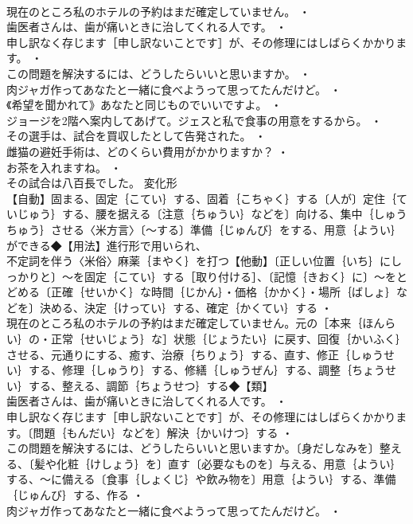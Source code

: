 \documentclass[8pt]{extreport}
\begin{document}
\begin{CJK}{UTF8}{min}
\\	現在のところ私のホテルの予約はまだ確定していません。 ・
\\	歯医者さんは、歯が痛いときに治してくれる人です。 ・
\\	申し訳なく存じます［申し訳ないことです］が、その修理にはしばらくかかります。 ・
\\	この問題を解決するには、どうしたらいいと思いますか。 ・
\\	肉ジャガ作ってあなたと一緒に食べようって思ってたんだけど。 ・
\\	《希望を聞かれて》あなたと同じものでいいですよ。 ・
\\	ジョージを2階へ案内してあげて。ジェスと私で食事の用意をするから。 ・
\\	その選手は、試合を買収したとして告発された。 ・
\\	雌猫の避妊手術は、どのくらい費用がかかりますか？ ・
\\	お茶を入れますね。 ・
\\	その試合は八百長でした。	変化形 
\\	【自動】固まる、固定｛こてい｝する、固着｛こちゃく｝する〔人が〕定住｛ていじゅう｝する、腰を据える〔注意｛ちゅうい｝などを〕向ける、集中｛しゅうちゅう｝させる〈米方言〉〔～する〕準備｛じゅんび｝をする、用意｛ようい｝ができる◆【用法】進行形で用いられ、
\\	不定詞を伴う〈米俗〉麻薬｛まやく｝を打つ【他動】〔正しい位置｛いち｝にしっかりと〕～を固定｛こてい｝する［取り付ける］、〔記憶｛きおく｝に〕～をとどめる〔正確｛せいかく｝な時間｛じかん｝・価格｛かかく｝・場所｛ばしょ｝などを〕決める、決定｛けってい｝する、確定｛かくてい｝する ・
\\	現在のところ私のホテルの予約はまだ確定していません。元の［本来｛ほんらい｝の・正常｛せいじょう｝な］状態｛じょうたい｝に戻す、回復｛かいふく｝させる、元通りにする、癒す、治療｛ちりょう｝する、直す、修正｛しゅうせい｝する、修理｛しゅうり｝する、修繕｛しゅうぜん｝する、調整｛ちょうせい｝する、整える、調節｛ちょうせつ｝する◆【類】
\\	歯医者さんは、歯が痛いときに治してくれる人です。 ・
\\	申し訳なく存じます［申し訳ないことです］が、その修理にはしばらくかかります。〔問題｛もんだい｝などを〕解決｛かいけつ｝する ・
\\	この問題を解決するには、どうしたらいいと思いますか。〔身だしなみを〕整える、〔髪や化粧｛けしょう｝を〕直す〔必要なものを〕与える、用意｛ようい｝する、～に備える〔食事｛しょくじ｝や飲み物を〕用意｛ようい｝する、準備｛じゅんび｝する、作る ・
\\	肉ジャガ作ってあなたと一緒に食べようって思ってたんだけど。 ・

\end{CJK}
\end{document}
